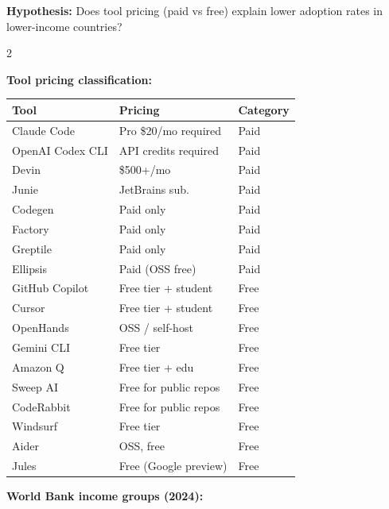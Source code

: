 \documentclass[10pt,a4paper]{article}
\begin{document}
\textbf{Hypothesis:} Does tool pricing (paid vs free) explain lower adoption rates in
lower-income countries?

\vspace{6pt}
\begin{multicols}{2}

\textbf{Tool pricing classification:}

\begin{tabular}{@{}lll@{}}
\toprule
Tool & Pricing & Category \\
\midrule
Claude Code       & Pro \$20/mo required  & Paid \\
OpenAI Codex CLI  & API credits required  & Paid \\
Devin             & \$500+/mo             & Paid \\
Junie             & JetBrains sub.        & Paid \\
Codegen           & Paid only             & Paid \\
Factory           & Paid only             & Paid \\
Greptile          & Paid only             & Paid \\
Ellipsis          & Paid (OSS free)       & Paid \\
\midrule
GitHub Copilot    & Free tier + student   & Free \\
Cursor            & Free tier + student   & Free \\
OpenHands         & OSS / self-host       & Free \\
Gemini CLI        & Free tier             & Free \\
Amazon Q          & Free tier + edu       & Free \\
Sweep AI          & Free for public repos & Free \\
CodeRabbit        & Free for public repos & Free \\
Windsurf          & Free tier             & Free \\
Aider             & OSS, free             & Free \\
Jules             & Free (Google preview) & Free \\
\bottomrule
\end{tabular}

\columnbreak

\textbf{World Bank income groups (2024):}


\end{multicols}
\end{document}
